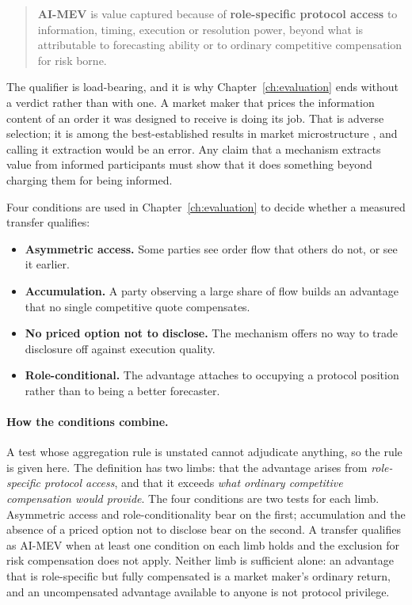 \begin{quote}
\textbf{AI-MEV} is value captured because of \textbf{role-specific protocol access} to
information, timing, execution or resolution power, beyond what is attributable to
forecasting ability or to ordinary competitive compensation for risk borne.
\end{quote}

The qualifier is load-bearing, and it is why Chapter~\ref{ch:evaluation} ends without a
verdict rather than with one. A market maker that prices the information content of an order
it was designed to receive is doing its job. That is adverse selection; it is among the best-established results in market
microstructure \cite{glosten1985bidask}, and calling it extraction would be an error. Any
claim that a mechanism extracts value from informed participants must show that it does
something beyond charging them for being informed.

Four conditions are used in Chapter~\ref{ch:evaluation} to decide whether a measured
transfer qualifies:

\begin{itemize}
  \item \textbf{Asymmetric access.} Some parties see order flow that others do not, or see
    it earlier.
  \item \textbf{Accumulation.} A party observing a large share of flow builds an advantage
    that no single competitive quote compensates.
  \item \textbf{No priced option not to disclose.} The mechanism offers no way to trade
    disclosure off against execution quality.
  \item \textbf{Role-conditional.} The advantage attaches to occupying a protocol position
    rather than to being a better forecaster.
\end{itemize}

\paragraph{How the conditions combine.} A test whose aggregation rule is unstated cannot
adjudicate anything, so the rule is given here. The definition has two limbs: that the
advantage arises from \emph{role-specific protocol access}, and that it exceeds \emph{what
ordinary competitive compensation would provide}. The four conditions are two tests for each
limb. Asymmetric access and role-conditionality bear on the first; accumulation and the
absence of a priced option not to disclose bear on the second. A transfer qualifies as
AI-MEV when at least one condition on each limb holds and the exclusion for risk
compensation does not apply. Neither limb is sufficient alone: an advantage that is
role-specific but fully compensated is a market maker's ordinary return, and an
uncompensated advantage available to anyone is not protocol privilege.

